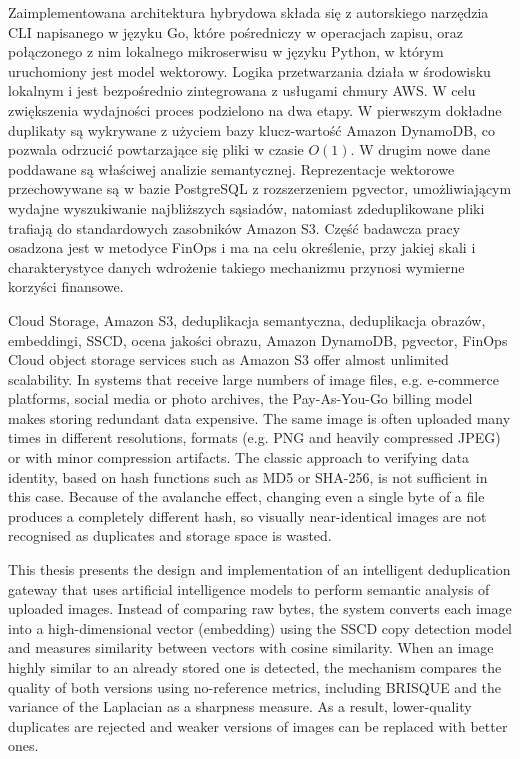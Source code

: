 \documentclass[
    bindingoffset=5mm,  %
    footnoteindent=3mm, %
    hyphenation=true    %
]{src/wut-thesis}
\begin{document}
Zaimplementowana architektura hybrydowa składa się z autorskiego narzędzia CLI napisanego w języku Go, które pośredniczy w operacjach zapisu, oraz połączonego z nim lokalnego mikroserwisu w języku Python, w którym uruchomiony jest model wektorowy. Logika przetwarzania działa w środowisku lokalnym i jest bezpośrednio zintegrowana z usługami chmury AWS. W celu zwiększenia wydajności proces podzielono na dwa etapy. W pierwszym dokładne duplikaty są wykrywane z użyciem bazy klucz-wartość Amazon DynamoDB, co pozwala odrzucić powtarzające się pliki w czasie $O(1)$. W drugim nowe dane poddawane są właściwej analizie semantycznej. Reprezentacje wektorowe przechowywane są w bazie PostgreSQL z rozszerzeniem pgvector, umożliwiającym wydajne wyszukiwanie najbliższych sąsiadów, natomiast zdeduplikowane pliki trafiają do standardowych zasobników Amazon S3. Część badawcza pracy osadzona jest w metodyce FinOps i ma na celu określenie, przy jakiej skali i charakterystyce danych wdrożenie takiego mechanizmu przynosi wymierne korzyści finansowe.

\keywords Cloud Storage, Amazon S3, deduplikacja semantyczna, deduplikacja obrazów, embeddingi, SSCD, ocena jakości obrazu, Amazon DynamoDB, pgvector, FinOps
\clearpage
\secondabstract
Cloud object storage services such as Amazon S3 offer almost unlimited scalability. In systems that receive large numbers of image files, e.g. e-commerce platforms, social media or photo archives, the Pay-As-You-Go billing model makes storing redundant data expensive. The same image is often uploaded many times in different resolutions, formats (e.g. PNG and heavily compressed JPEG) or with minor compression artifacts. The classic approach to verifying data identity, based on hash functions such as MD5 or SHA-256, is not sufficient in this case. Because of the avalanche effect, changing even a single byte of a file produces a completely different hash, so visually near-identical images are not recognised as duplicates and storage space is wasted.

This thesis presents the design and implementation of an intelligent deduplication gateway that uses artificial intelligence models to perform semantic analysis of uploaded images. Instead of comparing raw bytes, the system converts each image into a high-dimensional vector (embedding) using the SSCD copy detection model and measures similarity between vectors with cosine similarity. When an image highly similar to an already stored one is detected, the mechanism compares the quality of both versions using no-reference metrics, including BRISQUE and the variance of the Laplacian as a sharpness measure. As a result, lower-quality duplicates are rejected and weaker versions of images can be replaced with better ones.
\end{document}
